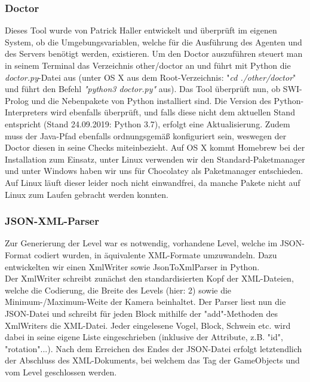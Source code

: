 \subsubsection{Doctor}
Dieses Tool wurde von Patrick Haller entwickelt und überprüft im eigenen System, ob die Umgebungsvariablen, welche für die Ausführung des Agenten und des Servers benötigt werden, existieren. Um den Doctor auszuführen steuert man in seinem Terminal das Verzeichnis other/doctor an und führt mit Python die \textit{doctor.py}-Datei aus (unter OS X aus dem Root-Verzeichnis: "\textit{cd ./other/doctor}" und führt den Befehl \textit{"python3 doctor.py"} aus). Das Tool überprüft nun, ob SWI-Prolog und die Nebenpakete von Python installiert sind. Die Version des Python-Interpreters wird ebenfalls überprüft, und falls diese nicht dem aktuellen Stand entspricht (Stand 24.09.2019: Python 3.7), erfolgt eine Aktualisierung.  Zudem muss der Java-Pfad ebenfalls ordnungsgemäß konfiguriert sein, weswegen der Doctor diesen in seine Checks miteinbezieht. Auf OS X kommt Homebrew bei der Installation zum Einsatz, unter Linux verwenden wir den Standard-Paketmanager und unter Windows haben wir uns für Chocolatey als Paketmanager entschieden. Auf Linux läuft dieser leider noch nicht einwandfrei, da manche Pakete nicht auf Linux zum Laufen gebracht werden konnten.
\subsubsection{JSON-XML-Parser}
Zur Generierung der Level war es notwendig, vorhandene Level, welche im JSON-Format codiert wurden, in äquivalente XML-Formate umzuwandeln. Dazu entwickelten wir einen XmlWriter sowie JsonToXmlParser in Python. \\ Der XmlWriter schreibt zunächst den standardisierten Kopf der XML-Dateien, welche die Codierung, die Breite des Levels (hier: 2) sowie die Minimum-/Maximum-Weite der Kamera beinhaltet. Der Parser liest nun die JSON-Datei und schreibt für jeden Block mithilfe der "add"-Methoden des XmlWriters die XML-Datei. Jeder eingelesene Vogel, Block, Schwein etc. wird dabei in seine eigene Liste eingeschrieben (inklusive der Attribute, z.B. "id", "rotation"...). Nach dem Erreichen des Endes der JSON-Datei erfolgt letztendlich der Abschluss des XML-Dokuments, bei welchem das Tag der GameObjects und vom Level geschlossen werden.